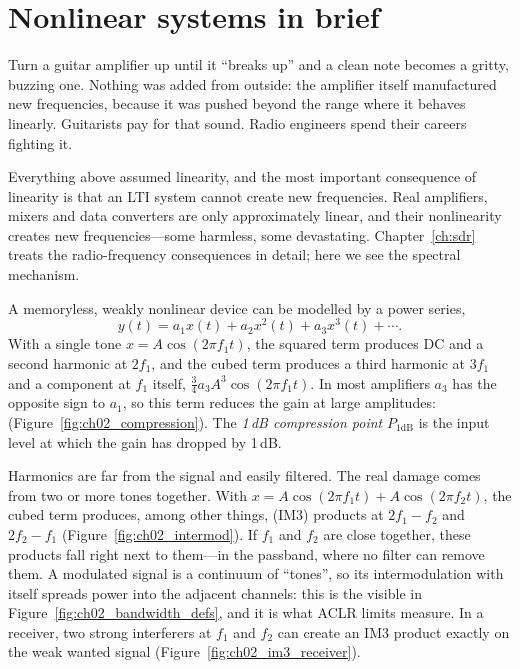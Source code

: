 \section{Nonlinear systems in brief}
\label{sec:ch02:nonlinear}

Turn a guitar amplifier up until it ``breaks up'' and a clean note becomes a gritty, buzzing one.
Nothing was added from outside: the amplifier itself manufactured new frequencies, because it was
pushed beyond the range where it behaves linearly. Guitarists pay for that sound. Radio engineers
spend their careers fighting it.

Everything above assumed linearity, and the most important consequence of linearity is that an LTI
system cannot create new frequencies. Real amplifiers, mixers and data converters are only
approximately linear, and their nonlinearity creates new frequencies---some harmless, some
devastating. Chapter~\ref{ch:sdr} treats the radio-frequency consequences in detail; here we see the
spectral mechanism.

A memoryless, weakly nonlinear device can be modelled by a power series,
\begin{equation}
y(t)=a_1x(t)+a_2x^2(t)+a_3x^3(t)+\cdots .
\label{eq:ch02:powerseries}
\end{equation}
With a single tone $x=A\cos(2\pi f_1t)$, the squared term produces DC and a second harmonic at
$2f_1$, and the cubed term produces a third harmonic at $3f_1$ and a component at $f_1$ itself,
$\tfrac34a_3A^3\cos(2\pi f_1t)$. In most amplifiers $a_3$ has the opposite sign to $a_1$, so this term
reduces the gain at large amplitudes:  (Figure~\ref{fig:ch02_compression}). The
\emph{1\,dB compression point} $P_{1\text{dB}}$ is the input level at which the gain has dropped by
1\,dB.


Harmonics are far from the signal and easily filtered. The real damage comes from two or more tones
together. With $x=A\cos(2\pi f_1t)+A\cos(2\pi f_2t)$, the cubed term produces, among other things,
 (IM3) products at $2f_1-f_2$ and $2f_2-f_1$
(Figure~\ref{fig:ch02_intermod}). If $f_1$ and $f_2$ are close together, these products fall right next
to them---in the passband, where no filter can remove them. A modulated signal is a continuum of
``tones'', so its intermodulation with itself spreads power into the adjacent channels: this is the
 visible in Figure~\ref{fig:ch02_bandwidth_defs}, and it is what ACLR limits
measure. In a receiver, two strong interferers at $f_1$ and $f_2$ can create an IM3 product exactly on
the weak wanted signal (Figure~\ref{fig:ch02_im3_receiver}).

